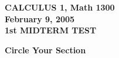 \documentclass{article}
\begin{document}
\begin{centering}
  \Large       \textbf{CALCULUS 1, Math 1300}         \\[02pt]
  \normalsize  \textbf{February 9, 2005}     \\[02pt]
  \Large       \textbf{1st MIDTERM TEST}   \\[10pt]
\end{centering}

\bigskip

\normalsize

\centerline{
}

\bigskip

\begin{centering}
    \textbf{Circle Your Section}\\
\end{centering}

\bigskip
\end{document}
